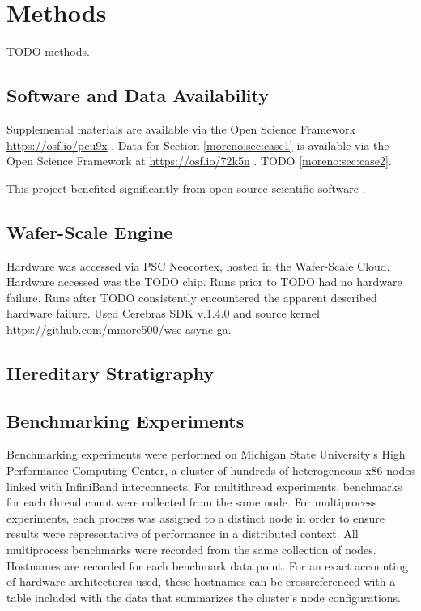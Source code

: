 \section{Methods} \label{moreno:sec:methods}

TODO methods.

\subsection{Software and Data Availability} \label{moreno:sec:software}

Supplemental materials are available via the Open Science Framework \url{https://osf.io/pcu9x} \cite{foster2017open,moreno_2026_trust}.
Data for Section \ref{moreno:sec:case1} is available via the Open Science Framework at \url{https://osf.io/72k5n} \citep{foster2017open}.
TODO \ref{moreno:sec:case2}.

This project benefited significantly from open-source scientific software \cite{2020SciPy-NMeth,harris2020array,reback2020pandas,mckinney-proc-scipy-2010,waskom2021seaborn,hunter2007matplotlib,moreno2023teeplot,yang2025downstream,moreno2021signalgp,vostinar2024empirical,moreno2022hstrat,moreno2022best,moreno2024wse}.

\subsection{Wafer-Scale Engine}

Hardware was accessed via PSC Neocortex, hosted in the Wafer-Scale Cloud.
Hardware accessed was the TODO chip.
Runs prior to TODO had no hardware failure.
Runs after TODO consistently encountered the apparent described hardware failure.
Used Cerebras SDK v.1.4.0 and source kernel \url{https://github.com/mmore500/wse-async-ga}.

\subsection{Hereditary Stratigraphy}

\cite{singhvi2025scalable,moreno2024structured,moreno2025testing}

\subsection{Benchmarking Experiments} \label{moreno:sec:methods-code-data-reproducibility-benchmarking-experiments}

Benchmarking experiments were performed on Michigan State University's High Performance Computing Center, a cluster of hundreds of heterogeneous x86 nodes linked with InfiniBand interconnects.
For multithread experiments, benchmarks for each thread count were collected from the same node.
For multiprocess experiments, each process was assigned to a distinct node in order to ensure results were representative of performance in a distributed context.
All multiprocess benchmarks were recorded from the same collection of nodes.
Hostnames are recorded for each benchmark data point.
For an exact accounting of hardware architectures used, these hostnames can be crossreferenced with a table included with the data that summarizes the cluster's node configurations.

